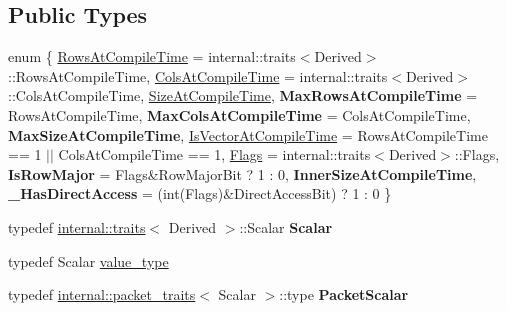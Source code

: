 \subsection*{Public Types}
\begin{DoxyCompactItemize}
\item 
enum \{ \newline
\mbox{\hyperlink{class_eigen_1_1_sparse_matrix_base_a11b30ed44f64a137b4fa1ee638ca2d36a456cda7b9d938e57194036a41d634604}{Rows\+At\+Compile\+Time}} = internal\+::traits$<$Derived$>$\+::Rows\+At\+Compile\+Time, 
\mbox{\hyperlink{class_eigen_1_1_sparse_matrix_base_a11b30ed44f64a137b4fa1ee638ca2d36a27ba349f075d026c1f51d1ec69aa5b14}{Cols\+At\+Compile\+Time}} = internal\+::traits$<$Derived$>$\+::Cols\+At\+Compile\+Time, 
\mbox{\hyperlink{class_eigen_1_1_sparse_matrix_base_a11b30ed44f64a137b4fa1ee638ca2d36aa5022cfa2bb53129883e9b7b8abd3d68}{Size\+At\+Compile\+Time}}, 
{\bfseries Max\+Rows\+At\+Compile\+Time} = Rows\+At\+Compile\+Time, 
\newline
{\bfseries Max\+Cols\+At\+Compile\+Time} = Cols\+At\+Compile\+Time, 
{\bfseries Max\+Size\+At\+Compile\+Time}, 
\mbox{\hyperlink{class_eigen_1_1_sparse_matrix_base_a11b30ed44f64a137b4fa1ee638ca2d36a14a3f566ed2a074beddb8aef0223bfdf}{Is\+Vector\+At\+Compile\+Time}} = Rows\+At\+Compile\+Time == 1 $\vert$$\vert$ Cols\+At\+Compile\+Time == 1, 
\mbox{\hyperlink{class_eigen_1_1_sparse_matrix_base_a11b30ed44f64a137b4fa1ee638ca2d36a2af043b36fe9e08df0107cf6de496165}{Flags}} = internal\+::traits$<$Derived$>$\+::Flags, 
\newline
{\bfseries Is\+Row\+Major} = Flags\&Row\+Major\+Bit ? 1 \+: 0, 
{\bfseries Inner\+Size\+At\+Compile\+Time}, 
{\bfseries \+\_\+\+Has\+Direct\+Access} = (int(Flags)\&Direct\+Access\+Bit) ? 1 \+: 0
 \}
\item 
\mbox{\label{class_eigen_1_1_sparse_matrix_base_a477b2830b50a0a04260463d6f8def336}} 
typedef \mbox{\hyperlink{struct_eigen_1_1internal_1_1traits}{internal\+::traits}}$<$ Derived $>$\+::Scalar {\bfseries Scalar}
\item 
typedef Scalar \mbox{\hyperlink{class_eigen_1_1_sparse_matrix_base_ac254d3b61718ebc2136d27bac043dcb7}{value\+\_\+type}}
\item 
\mbox{\label{class_eigen_1_1_sparse_matrix_base_a6173fac1d813918bfae8091df083b917}} 
typedef \mbox{\hyperlink{struct_eigen_1_1internal_1_1packet__traits}{internal\+::packet\+\_\+traits}}$<$ Scalar $>$\+::type {\bfseries Packet\+Scalar}
$$
\end{DoxyCompactItemize}

